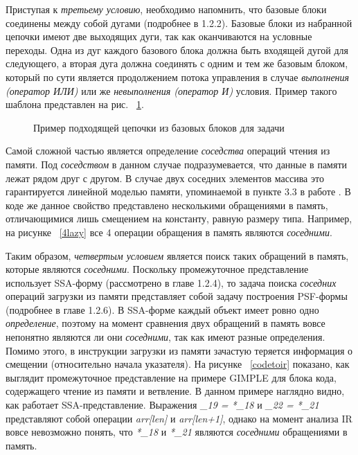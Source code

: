 Приступая к \textit{третьему условию}, необходимо напомнить, что базовые блоки соединены между собой дугами (подробнее в 1.2.2). Базовые блоки из набранной цепочки имеют две выходящих дуги, так как оканчиваются на условные переходы. Одна из дуг каждого базового блока должна быть входящей дугой для следующего, а вторая дуга должна соединять с одним и тем же базовым блоком, который по сути является продолжением потока управления в случае \textit{выполнения (оператор ИЛИ)} или же \textit{невыполнения (оператор И)} условия. Пример такого шаблона представлен на рис. ~\ref{bbchain}.

\begin{figure}[!htb]
    \centering
    
    \caption{Пример подходящей цепочки из базовых блоков для задачи}
    \label{bbchain}
\end{figure}



Самой сложной частью является определение \textit{соседства} операций чтения из памяти. Под \textit{соседством} в данном случае подразумевается, что данные в памяти лежат рядом друг с другом. В случае двух соседних элементов массива это гарантируется линейной моделью памяти, упоминаемой в пункте 3.3 в работе \cite{pohl2018control}. В коде же данное свойство представлено несколькими обращениями в память, отличающимися лишь смещением на константу, равную размеру типа. Например, на рисунке ~\ref{4lazy} все 4 операции обращения в память являются \textit{соседними}. 

Таким образом, \textit{четвертым условием} является поиск таких обращений в память, которые являются \textit{соседними}. Поскольку промежуточное представление использует SSA-форму (рассмотрено в главе 1.2.4), то задача поиска \textit{соседних} операций загрузки из памяти представляет собой задачу построения PSF-формы (подробнее в главе 1.2.6). В SSA-форме каждый объект имеет ровно одно \textit{определение}, поэтому на момент сравнения двух обращений в память вовсе непонятно являются ли они \textit{соседними}, так как имеют разные определения. Помимо этого, в инструкции загрузки из памяти зачастую теряется информация о смещении (относительно начала указателя). На рисунке ~\ref{codetoir} показано, как выглядит промежуточное представление на примере GIMPLE для блока кода, содержащего чтение из памяти и ветвление. В данном примере наглядно видно, как работает SSA-представление. Выражения \textit{\_19 = *\_18} и \textit{\_22 = *\_21} представляют собой операции \textit{arr[len]} и \textit{arr[len+1]}, однако на момент анализа IR вовсе невозможно понять, что \textit{*\_18} и \textit{*\_21} являются \textit{соседними} обращениями в память.

